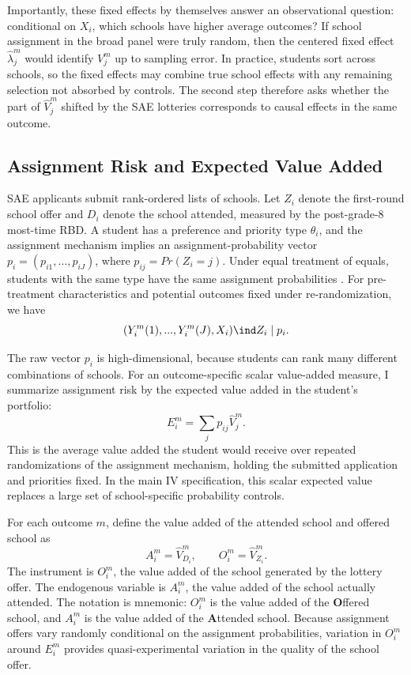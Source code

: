 \documentclass[a4paper, article, english, oneside, unknownkeysallowed, 12pt]{memoir}
\begin{document}
Importantly, these fixed effects by themselves answer an observational question: conditional on $X_i$, which schools have higher average outcomes?
If school assignment in the broad panel were truly random, then the centered fixed effect $\widehat{\lambda}_j^m$ would identify $V_j^m$ up to sampling error.
In practice, students sort across schools, so the fixed effects may combine true school effects with any remaining selection not absorbed by controls.
The second step therefore asks whether the part of $\widehat{V}_j^m$ shifted by the SAE lotteries corresponds to causal effects in the same outcome.


\subsection{Assignment Risk and Expected Value Added}

SAE applicants submit rank-ordered lists of schools.
Let $Z_i$ denote the first-round school offer and $D_i$ denote the school attended, measured by the post-grade-8 most-time RBD.
A student has a preference and priority type $\theta_i$, and the assignment mechanism implies an assignment-probability vector $p_i=(p_{i1},...,p_{iJ})$, where $p_{ij}=Pr(Z_i=j)$.
Under equal treatment of equals, students with the same type have the same assignment probabilities \parencite{abdulkadiroglu_research_2017}.
For pre-treatment characteristics and potential outcomes fixed under re-randomization, we have
\begin{equation}
  (Y_i^m(1),...,Y_i^m(J), X_i) \ind Z_i \mid p_i.
  \label{eq:offer-independence}
\end{equation}

The raw vector $p_i$ is high-dimensional, because students can rank many different combinations of schools.
For an outcome-specific scalar value-added measure, I summarize assignment risk by the expected value added in the student's portfolio:
\begin{equation}
  E_i^m = \sum_j p_{ij}\widehat{V}_j^m.
  \label{eq:expected-va}
\end{equation}
This is the average value added the student would receive over repeated randomizations of the assignment mechanism, holding the submitted application and priorities fixed.
In the main IV specification, this scalar expected value replaces a large set of school-specific probability controls.

For each outcome $m$, define the value added of the attended school and offered school as
\begin{equation}
  A_i^m = \widehat{V}_{D_i}^m,
  \qquad
  O_i^m = \widehat{V}_{Z_i}^m.
  \label{eq:attended-offered-va}
\end{equation}
The instrument is $O_i^m$, the value added of the school generated by the lottery offer.
The endogenous variable is $A_i^m$, the value added of the school actually attended.
The notation is mnemonic: $O_i^m$ is the value added of the \textbf{O}ffered school, and $A_i^m$ is the value added of the \textbf{A}ttended school.
Because assignment offers vary randomly conditional on the assignment probabilities, variation in $O_i^m$ around $E_i^m$ provides quasi-experimental variation in the quality of the school offer.
\end{document}
